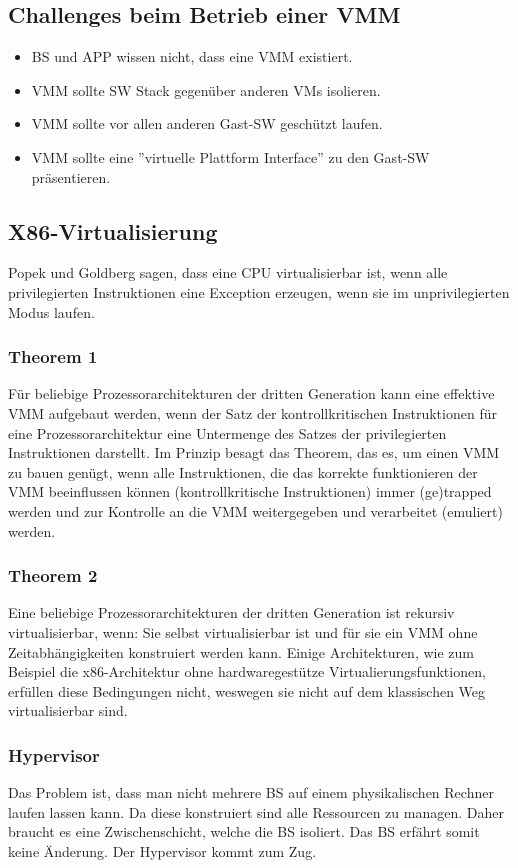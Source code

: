 \subsection{Challenges beim Betrieb einer VMM}
\begin{itemize}
	\item BS und APP wissen nicht, dass eine VMM existiert.
	\item VMM sollte SW Stack gegenüber anderen VMs isolieren.
	\item VMM sollte vor allen anderen Gast-SW geschützt laufen.
	\item VMM sollte eine ''virtuelle Plattform Interface'' zu den Gast-SW präsentieren.
\end{itemize}


\subsection{X86-Virtualisierung}
Popek und Goldberg sagen, dass eine CPU virtualisierbar ist, wenn alle privilegierten Instruktionen eine Exception erzeugen, wenn sie im unprivilegierten Modus laufen.

\subsubsection{Theorem 1}
Für beliebige Prozessorarchitekturen der dritten Generation kann
eine effektive VMM aufgebaut werden, wenn der Satz der
kontrollkritischen Instruktionen für eine Prozessorarchitektur
eine Untermenge des Satzes der privilegierten Instruktionen
darstellt.
Im Prinzip besagt das Theorem, das es, um einen VMM zu bauen
genügt, wenn alle Instruktionen, die das korrekte funktionieren
der VMM beeinflussen können (kontrollkritische Instruktionen)
immer (ge)trapped werden und zur Kontrolle an die VMM
weitergegeben und verarbeitet (emuliert) werden.

\subsubsection{Theorem 2}
Eine beliebige Prozessorarchitekturen der dritten Generation ist
rekursiv virtualisierbar, wenn: Sie selbst virtualisierbar ist und für sie ein VMM ohne Zeitabhängigkeiten konstruiert werden
kann.
Einige Architekturen, wie zum Beispiel die x86-Architektur ohne
hardwaregestütze Virtualierungsfunktionen, erfüllen diese
Bedingungen nicht, weswegen sie nicht auf dem klassischen Weg
virtualisierbar sind.

\subsubsection{Hypervisor}
Das Problem ist, dass man nicht mehrere BS auf einem physikalischen Rechner laufen lassen kann. Da diese konstruiert sind alle Ressourcen zu managen. Daher braucht es eine Zwischenschicht, welche die BS isoliert. Das BS erfährt somit keine Änderung. Der Hypervisor kommt zum Zug.

